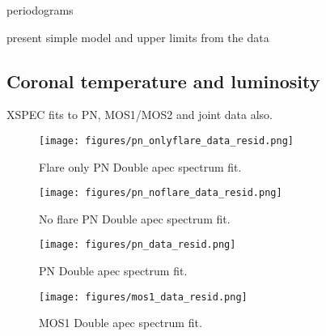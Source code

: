 \documentclass[twocolumn]{aastex631}
\begin{document}
periodograms

present simple model and upper limits from the data

\subsection{Coronal temperature and luminosity}
\begin{table*}
\footnotesize
    \caption{XSPEC fits to PN, MOS1/MOS2 and joint data also.}
    
        \label{tab:specfit}
\end{table*}

\begin{figure}
    \begin{centering}
        \texttt{[image: figures/pn\_onlyflare\_data\_resid.png]}
        \caption{
         Flare only PN Double apec spectrum fit.
        }
        \label{fig:spec_pn_onlyflare}
    \end{centering}
\end{figure}

\begin{figure}
    \begin{centering}
        \texttt{[image: figures/pn\_noflare\_data\_resid.png]}
        \caption{
         No flare PN Double apec spectrum fit.
        }
        \label{fig:spec_pn_noflare}
    \end{centering}
\end{figure}

\begin{figure}
    \begin{centering}
        \texttt{[image: figures/pn\_data\_resid.png]}
        \caption{
         PN Double apec spectrum fit.
        }
        \label{fig:spec_pn}
    \end{centering}
\end{figure}

\begin{figure}
    \begin{centering}
        \texttt{[image: figures/mos1\_data\_resid.png]}
        \caption{
         MOS1 Double apec spectrum fit.
        }
        \label{fig:spec_mos1}
    \end{centering}
\end{figure}
\end{document}
